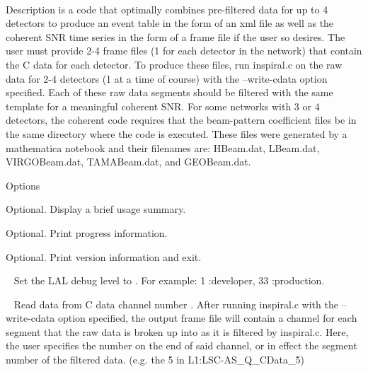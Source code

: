 \begin{entry}
~ \newline \hspace*{0.5in}
~ \newline \hspace*{0.5in}
~ \newline \hspace*{0.5in}
~ \newline \hspace*{0.5in}
~ \newline \hspace*{0.5in}              

\item[Description] 
 is a code that optimally combines 
pre-filtered data for up to 4 detectors to produce an event table in the form 
of an xml file as well as the coherent SNR time series in the form of a frame 
file if the user so desires.  The user must provide 2-4 frame files 
(1 for each detector in the network) that contain the C data for each detector.
To produce these files, run inspiral.c on the raw data for 2-4 detectors 
(1 at a time of course) with the --write-cdata option specified. Each of these
raw data segments should be filtered with the same template for a meaningful 
coherent SNR. For some networks with 3 or 4 detectors, the coherent code 
requires that the beam-pattern coefficient files be in the same directory where
the code is executed.  These files were generated by a mathematica notebook  
and their filenames are: HBeam.dat, LBeam.dat, VIRGOBeam.dat, TAMABeam.dat, 
and GEOBeam.dat.     

\item[Options]\leavevmode
\begin{entry}
\item[\option{--help}] Optional. Display a brief usage summary.

\item[\option{--verbose}] Optional. Print progress information.

\item[\option{--version}] Optional. Print version information and exit.

\item[\option{--debug-level}~\parm{LEVEL}] Set the LAL debug level to 
. For example: 1 :developer, 33 :production.

\item[\option{--channel-number}~\parm{CHANNUMBER}] Read data from 
C data channel number . After running inspiral.c with the 
--write-cdata option specified, the output frame file will contain a channel 
for each segment that the raw data is broken up into as it is filtered by 
inspiral.c. Here, the user specifies the number on the end of said channel, or in effect the segment number of the filtered data.  (e.g. the 5 in L1:LSC-AS\_Q\_CData\_5) 


\end{entry}
\end{entry}
